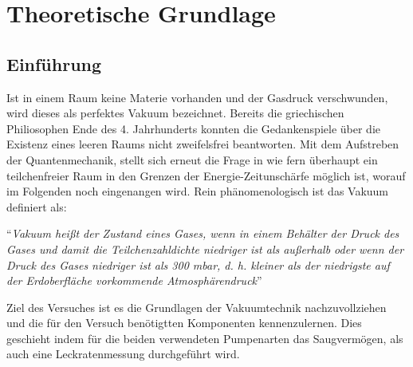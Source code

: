 \section{Theoretische Grundlage}
\label{sec:Theorie}

\subsection{Einführung}
Ist in einem Raum keine Materie vorhanden und der Gasdruck verschwunden, wird dieses als perfektes Vakuum bezeichnet. Bereits die griechischen Philiosophen Ende des 4. Jahrhunderts konnten die Gedankenspiele über die Existenz eines leeren Raums nicht zweifelsfrei beantworten. Mit dem Aufstreben der Quantenmechanik, stellt sich erneut die Frage in wie fern überhaupt ein teilchenfreier Raum in den Grenzen der Energie-Zeitunschärfe möglich ist, worauf im Folgenden noch eingenangen wird. Rein phänomenologisch ist das Vakuum definiert als:

``\textit{Vakuum heißt der Zustand eines Gases, wenn in einem Behälter der Druck des Gases und damit die Teilchenzahldichte niedriger ist als außerhalb oder wenn der Druck des Gases niedriger ist als 300 mbar, d. h. kleiner als der niedrigste auf der Erdoberfläche vorkommende Atmosphärendruck}'' \cite{DIN}

Ziel des Versuches ist es die Grundlagen der Vakuumtechnik nachzuvollziehen und die für den Versuch benötigtten Komponenten kennenzulernen. Dies geschieht indem für die beiden verwendeten Pumpenarten das Saugvermögen, als auch eine Leckratenmessung durchgeführt wird.

